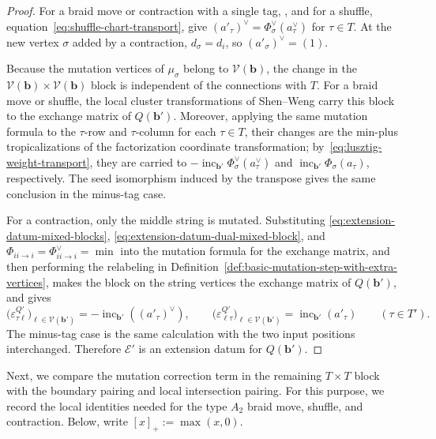 \documentclass[10pt,a4paper]{article}
\theoremstyle{definition}
\theoremstyle{remark}
\newcommand{\Vcal}{\mathcal V}
\newcommand{\eps}{\varepsilon}
\begin{document}
\begin{proof}
For a braid move or contraction with a single tag,
\cite[Lemma~6.1]{CasalsEtAlBraidVarieties}, and for a shuffle,
equation~\eqref{eq:shuffle-chart-transport}, give
\((a'_\tau)^\vee=\Phi_\sigma^\vee(a_\tau^\vee)\) for \(\tau\in T\).  At the
new vertex \(\sigma\) added by a contraction, \(d_\sigma=d_i\), so
\((a'_\sigma)^\vee=(1)\).

Because the mutation vertices of \(\mu_\sigma\) belong to
\(\Vcal(\mathbf b)\), the change in the
\(\Vcal(\mathbf b)\times\Vcal(\mathbf b)\) block is independent of the
connections with \(T\).  For a braid move or shuffle, the local cluster
transformations of Shen--Weng
\cite[Propositions~3.7 and~3.9]{ShenWeng2021} carry this block to the exchange
matrix of \(Q(\mathbf b')\).  Moreover, applying the same mutation formula to
the \(\tau\)-row and \(\tau\)-column for each \(\tau\in T\), their changes are
the min-plus tropicalizations of the factorization coordinate transformation;
by~\eqref{eq:lusztig-weight-transport}, they are carried to
\(-\operatorname{inc}_{\mathbf b'}\Phi_\sigma^\vee(a_\tau^\vee)\) and
\(\operatorname{inc}_{\mathbf b'}\Phi_\sigma(a_\tau)\), respectively.  The
seed isomorphism induced by the transpose
\cite[Proposition~3.9]{ShenWeng2021} gives the same conclusion in the minus-tag
case.

For a contraction, only the middle string is mutated.  Substituting
\eqref{eq:extension-datum-mixed-blocks},
\eqref{eq:extension-datum-dual-mixed-block}, and
\(\Phi_{ii\to i}=\Phi_{ii\to i}^\vee=\min\) into the mutation formula for the
exchange matrix, and then performing the relabeling in
Definition~\ref{def:basic-mutation-step-with-extra-vertices}, makes the block
on the string vertices the exchange matrix of \(Q(\mathbf b')\), and gives
\[
 \bigl(\eps^{Q'}_{\tau\ell}\bigr)_{\ell\in\Vcal(\mathbf b')}
 =-\operatorname{inc}_{\mathbf b'}((a'_\tau)^\vee),
 \qquad
 \bigl(\eps^{Q'}_{\ell\tau}\bigr)_{\ell\in\Vcal(\mathbf b')}
 =\operatorname{inc}_{\mathbf b'}(a'_\tau)
 \qquad(\tau\in T').
\]
The minus-tag case is the same calculation with the two input positions
interchanged.  Therefore \(\mathcal E'\) is an extension datum for
\(Q(\mathbf b')\).
\end{proof}

Next, we compare the mutation correction term in the remaining
\(T\times T\) block with the boundary pairing and local intersection pairing.
For this purpose, we record the local identities needed for the type \(A_2\)
braid move, shuffle, and contraction.  Below, write \([x]_+:=\max(x,0)\).
\end{document}

